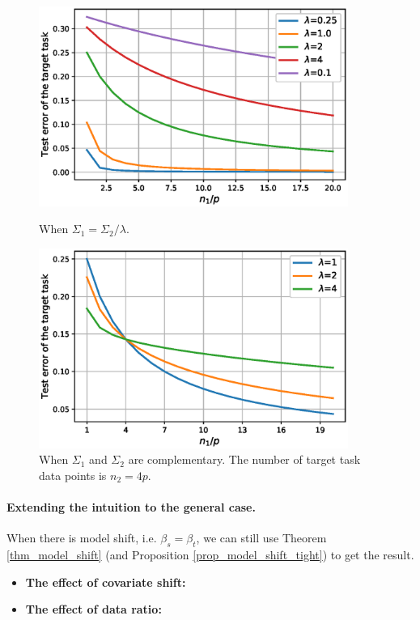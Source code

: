 \begin{figure}
	\centering
	\begin{minipage}{0.48\textwidth}
		\centering
		\includegraphics[width=0.9\textwidth]{figures/scaling.eps}
		\caption{When $\Sigma_1 = \Sigma_2 / \lambda$.}
		\label{fig_te_scaling}
	\end{minipage}\hfill
	\begin{minipage}{0.48\textwidth}
		\centering
		\includegraphics[width=0.9\textwidth]{figures/complementary.eps}
		\caption{When $\Sigma_1$ and $\Sigma_2$ are complementary. The number of target task data points is $n_2 = 4p$.}
		\label{fig_te_complement}
	\end{minipage}
\end{figure}


\paragraph{Extending the intuition to the general case.}
When there is model shift, i.e. $\beta_s = \beta_t$, we can still use Theorem \ref{thm_model_shift} (and Proposition \ref{prop_model_shift_tight}) to get the result.
\begin{itemize}
	\item \textbf{The effect of covariate shift:}
	\item \textbf{The effect of data ratio:}
\end{itemize}










